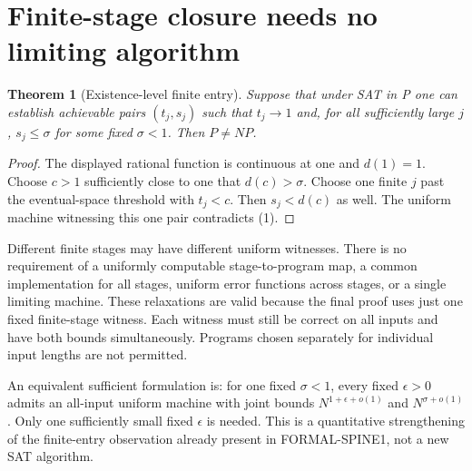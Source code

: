 \documentclass[11pt]{article}
\newtheorem{theorem}{Theorem}
\begin{document}
\section{Finite-stage closure needs no limiting algorithm}
\begin{theorem}[Existence-level finite entry]
Suppose that under SAT in P one can establish achievable pairs $(t_j,s_j)$ such that $t_j\to1$ and, for all sufficiently large $j$, $s_j\le\sigma$ for some fixed $\sigma<1$. Then $P\ne NP$.
\end{theorem}
\begin{proof}
The displayed rational function is continuous at one and $d(1)=1$. Choose $c>1$ sufficiently close to one that $d(c)>\sigma$. Choose one finite $j$ past the eventual-space threshold with $t_j<c$. Then $s_j<d(c)$ as well. The uniform machine witnessing this one pair contradicts (1).
\end{proof}
Different finite stages may have different uniform witnesses. There is no requirement of a uniformly computable stage-to-program map, a common implementation for all stages, uniform error functions across stages, or a single limiting machine. These relaxations are valid because the final proof uses just one fixed finite-stage witness. Each witness must still be correct on all inputs and have both bounds simultaneously. Programs chosen separately for individual input lengths are not permitted.

An equivalent sufficient formulation is: for one fixed $\sigma<1$, every fixed $\epsilon>0$ admits an all-input uniform machine with joint bounds $N^{1+\epsilon+o(1)}$ and $N^{\sigma+o(1)}$. Only one sufficiently small fixed $\epsilon$ is needed. This is a quantitative strengthening of the finite-entry observation already present in FORMAL-SPINE1, not a new SAT algorithm.
\end{document}
